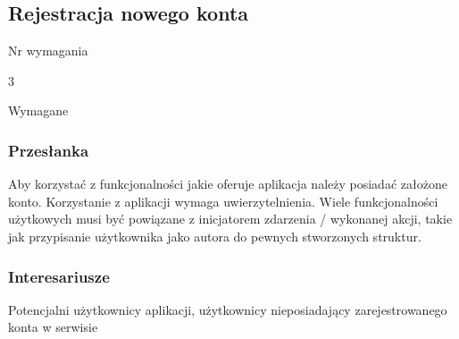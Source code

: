 \documentclass[eng,printmode]{mgr}
\begin{document}
\subsection{Rejestracja nowego konta}
\begin{labeling}{Nr wymagania}
\item [Nr wymagania:] 3
\item [Priorytet:] Wymagane
\end{labeling}

\subsubsection{Przesłanka}
Aby korzystać z funkcjonalności jakie oferuje aplikacja należy posiadać założone konto. Korzystanie z aplikacji wymaga uwierzytelnienia. Wiele funkcjonalności użytkowych musi być powiązane z inicjatorem zdarzenia / wykonanej akcji, takie jak przypisanie użytkownika jako autora do pewnych stworzonych struktur.

\subsubsection{Interesariusze}
Potencjalni użytkownicy aplikacji, użytkownicy nieposiadający zarejestrowanego konta w serwisie
\end{document}
